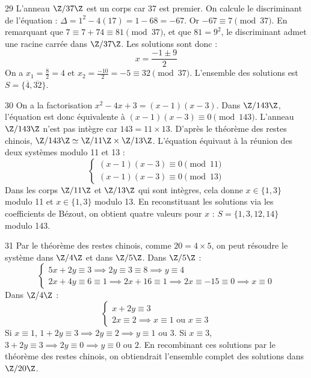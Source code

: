 \begin{correction}{29}
L'anneau $\Z/37\Z$ est un corps car 37 est premier. 
On calcule le discriminant de l'équation : $\Delta = 1^2 - 4(17) = 1 - 68 = -67$. 
Or $-67 \equiv 7 \pmod{37}$. 
En remarquant que $7 \equiv 7+74 \equiv 81 \pmod{37}$, et que $81 = 9^2$, le discriminant admet une racine carrée dans $\Z/37\Z$.
Les solutions sont donc :
\[x = \frac{-1 \pm 9}{2}\]
On a $x_1 = \frac{8}{2} = 4$ et $x_2 = \frac{-10}{2} = -5 \equiv 32 \pmod{37}$. 
L'ensemble des solutions est $S = \{\overline{4}, \overline{32}\}$. 
\end{correction}

\begin{correction}{30}
On a la factorisation $x^2 - 4x + 3 = (x-1)(x-3)$. 
Dans $\Z/143\Z$, l'équation est donc équivalente à $(x-1)(x-3) \equiv 0 \pmod{143}$. 
L'anneau $\Z/143\Z$ n'est pas intègre car $143 = 11 \times 13$. 
D'après le théorème des restes chinois, $\Z/143\Z \simeq \Z/11\Z \times \Z/13\Z$. 
L'équation équivaut à la réunion des deux systèmes modulo 11 et 13 :
\[\begin{cases} (x-1)(x-3) \equiv 0 \pmod{11} \\ (x-1)(x-3) \equiv 0 \pmod{13} \end{cases}\] 
Dans les corps $\Z/11\Z$ et $\Z/13\Z$ qui sont intègres, cela donne $x \in \{1, 3\}$ modulo 11 et $x \in \{1, 3\}$ modulo 13. 
En reconstituant les solutions via les coefficients de Bézout, on obtient quatre valeurs pour $x$ :
$S = \{1, 3, 12, 14\}$ modulo 143. 
\end{correction}

\begin{correction}{31}
Par le théorème des restes chinois, comme $20 = 4 \times 5$, on peut résoudre le système dans $\Z/4\Z$ et dans $\Z/5\Z$. 
Dans $\Z/5\Z$ : 
\[\begin{cases}5x+2y \equiv 3 \implies 2y \equiv 3 \equiv 8 \implies y \equiv 4 \\ 2x+4y \equiv 6 \equiv 1 \implies 2x + 16 \equiv 1 \implies 2x \equiv -15 \equiv 0 \implies x \equiv 0\end{cases}\] 
Dans $\Z/4\Z$ : 
\[\begin{cases} x+2y \equiv 3 \\ 2x \equiv 2 \implies x \equiv 1 \text{ ou } x \equiv 3 \end{cases}\] 
Si $x \equiv 1$, $1+2y \equiv 3 \implies 2y \equiv 2 \implies y \equiv 1 \text{ ou } 3$.
Si $x \equiv 3$, $3+2y \equiv 3 \implies 2y \equiv 0 \implies y \equiv 0 \text{ ou } 2$.
En recombinant ces solutions par le théorème des restes chinois, on obtiendrait l'ensemble complet des solutions dans $\Z/20\Z$.
\end{correction}

